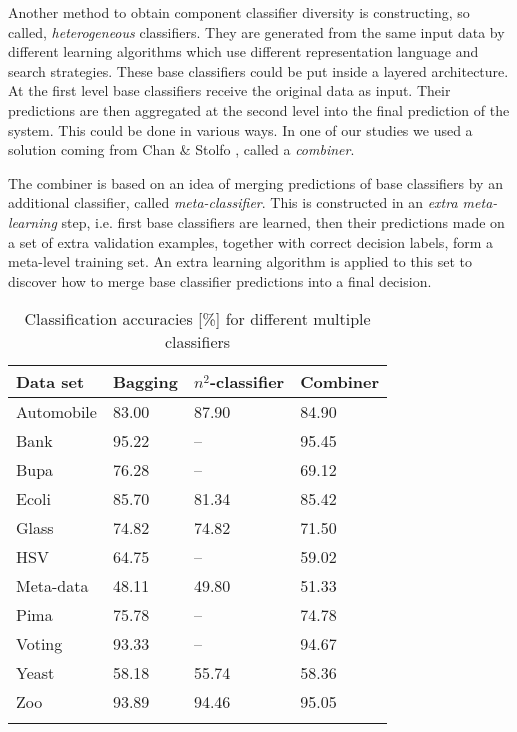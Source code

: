\documentclass{llncs}
\begin{document}
Another method to obtain component classifier diversity is constructing, so
called, {\em heterogeneous} classifiers.  They are generated from the same
input data by different learning algorithms which use different
representation language and search strategies. These base classifiers could
be put inside a layered architecture. At the first level base classifiers
receive the original data as input. Their predictions are then aggregated at
the second level into the final prediction of the system. This could be done
in various ways. In one of our studies we used a solution coming from Chan
\& Stolfo \cite{ChanStolfo97}, called a {\em combiner}.

The combiner is based on an idea of merging predictions of base classifiers
by an additional classifier, called {\em meta-classifier}. This is
constructed in an {\em extra meta-learning} step, i.e. first base
classifiers are learned, then their predictions made on a set
 of extra validation examples, together with correct decision labels, form
 a meta-level training set. An extra learning algorithm is applied to this
 set to discover how to merge base classifier predictions into a final
 decision.


\begin{table}
\label{comparison} \centering
\caption{Classification accuracies [\%] for
different multiple classifiers}
\begin{tabular}{llll}
\hline\noalign{\smallskip}
 Data set &  Bagging & $n^2$-classifier & Combiner
\\
 \hline\noalign{\smallskip}
 Automobile & 83.00 & 87.90 &  84.90 \\
 Bank & 95.22 & -- & 95.45 \\
 Bupa & 76.28 & -- & 69.12 \\
 Ecoli & 85.70 & 81.34 & 85.42 \\
 Glass & 74.82 & 74.82 &  71.50 \\
 HSV & 64.75 & -- & 59.02 \\
  Meta-data & 48.11 & 49.80  & 51.33 \\
 Pima & 75.78 & -- &  74.78 \\
 Voting & 93.33 & -- &  94.67 \\
 Yeast & 58.18 & 55.74 & 58.36 \\
 Zoo &  93.89 & 94.46 & 95.05 \\
 \noalign{\smallskip}
 \hline
\end{tabular}
\end{table}
\end{document}
